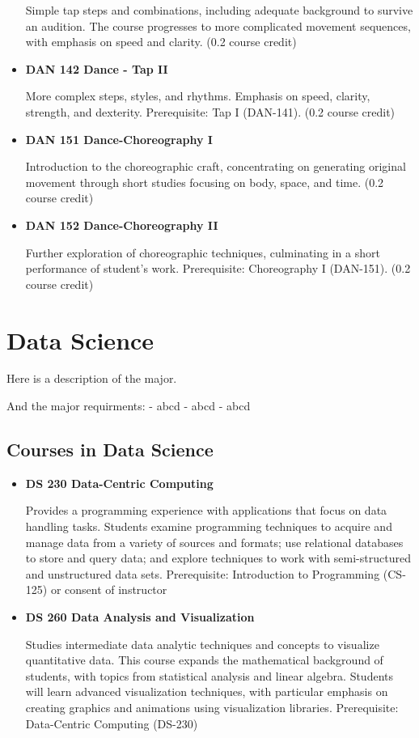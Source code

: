 \documentclass[
  letterpaper,
]{scrbook}
\begin{document}
\begin{itemize}
  Simple tap steps and combinations, including adequate background to
  survive an audition. The course progresses to more complicated
  movement sequences, with emphasis on speed and clarity. (0.2 course
  credit)
\item
  \textbf{DAN 142 Dance - Tap II}

  More complex steps, styles, and rhythms. Emphasis on speed, clarity,
  strength, and dexterity. Prerequisite: Tap I (DAN-141). (0.2 course
  credit)
\item
  \textbf{DAN 151 Dance-Choreography I}

  Introduction to the choreographic craft, concentrating on generating
  original movement through short studies focusing on body, space, and
  time. (0.2 course credit)
\item
  \textbf{DAN 152 Dance-Choreography II}

  Further exploration of choreographic techniques, culminating in a
  short performance of student's work. Prerequisite: Choreography I
  (DAN-151). (0.2 course credit)
\end{itemize}

\hypertarget{data-science}{%
\section{Data Science}\label{data-science}}

Here is a description of the major.

And the major requirments: - abcd - abcd - abcd

\hypertarget{courses-in-data-science}{%
\subsection{Courses in Data Science}\label{courses-in-data-science}}

\begin{itemize}
\item
  \textbf{DS 230 Data-Centric Computing}

  Provides a programming experience with applications that focus on data
  handling tasks. Students examine programming techniques to acquire and
  manage data from a variety of sources and formats; use relational
  databases to store and query data; and explore techniques to work with
  semi-structured and unstructured data sets. Prerequisite: Introduction
  to Programming (CS-125) or consent of instructor
\item
  \textbf{DS 260 Data Analysis and Visualization}

  Studies intermediate data analytic techniques and concepts to
  visualize quantitative data. This course expands the mathematical
  background of students, with topics from statistical analysis and
  linear algebra. Students will learn advanced visualization techniques,
  with particular emphasis on creating graphics and animations using
  visualization libraries. Prerequisite: Data-Centric Computing (DS-230)
\end{itemize}
\end{document}
